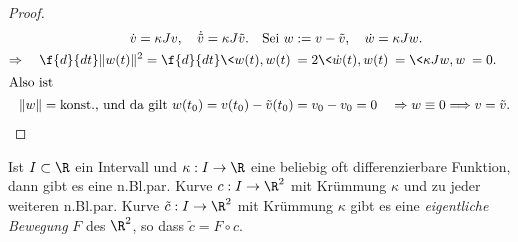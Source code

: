 \documentclass{mycourse}
\begin{document}
\begin{lem}
\begin{proof}
\begin{align*} 
\dot v = \kappa J v , \quad \dot{\tilde v} = \kappa J \tilde v. \quad \text{Sei } w &:= v - \tilde v, \quad \dot w = \kappa J w. \\
\Rightarrow \quad \f{d}{dt} \| w(t) \|^2 = \f{d}{dt} \< w(t), w(t)  \> &= 2 \< \dot w(t), w(t) \> = \< \kappa J w, w \> = 0. \\
\intertext{Also ist } \| w \| = \text{konst., und da gilt } w(t_0) = v(t_0) - \tilde v(t_0) &= v_0 - v_0 = 0 \quad \Rightarrow w \equiv 0 \Longrightarrow v = \tilde v. 
\end{align*}
\end{proof}
\end{lem}

\begin{st}
\label{3.7}
Ist $I \subset \R$  ein Intervall und $\kappa : I \to \R$ eine beliebig oft differenzierbare Funktion, dann gibt es eine n.Bl.par. Kurve $c: I \to \R^2$ mit Krümmung $\kappa$ und zu jeder weiteren n.Bl.par. Kurve $\tilde c: I \to \R^2$ mit Krümmung $\kappa$ gibt es eine \emph{eigentliche Bewegung} $F$ des $\R^2$, so dass $\tilde c = F \circ c$.


\end{st}
\end{document}
